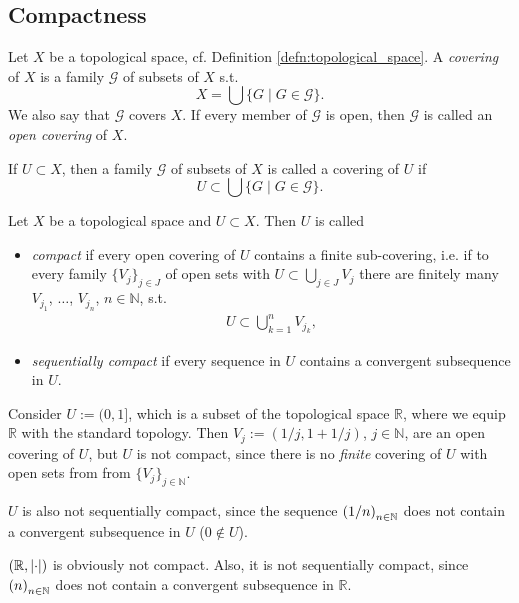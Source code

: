 \subsection{Compactness}

\begin{defn}
	Let $X$ be a topological space, cf. Definition \ref{defn:topological_space}. A \textit{covering} of $X$ is a family $\mathscr G$ of subsets of $X$ s.t. $$X = \bigcup\{G\mid G\in\mathscr G\}.$$
	We also say that $\mathscr G$ covers $X$. If every member of $\mathscr G$ is open, then $\mathscr G$ is called an \textit{open covering} of $X$.
	
	If $U\subset X$, then a family $\mathscr G$ of subsets of $X$ is called a covering of $U$ if
	$$U \subset \bigcup \{G\mid G\in \mathscr G\}.$$
\end{defn}

\begin{defn}
	Let $X$ be a topological space and $U\subset X$. Then $U$ is called 
	\begin{itemize}
		\item \textit{compact} if every open covering of $U$ contains a finite sub-covering, i.e. if to every family $\{V_j\}_{j\in J}$ of open sets with $U \subset \bigcup_{j\in J} V_j$ there are finitely many $V_{j_1}$, $\dots$, $V_{j_n}$, $n\in\mathbb N$, s.t. 
		\begin{align*}
			U \subset \bigcup_{k = 1}^{n}V_{j_k},
		\end{align*}
		\item \textit{sequentially compact} if every sequence in $U$ contains a convergent subsequence in $U$.
	\end{itemize}
\end{defn}

\begin{exmp}
	Consider $U := (0, 1]$, which is a subset of the topological space $\mathbb R$, where we equip $\mathbb R$ with the standard topology. Then $V_j := (1/j, 1 + 1/j)$, $j\in\mathbb N$, are an open covering of $U$, but $U$ is not compact, since there is no \textit{finite} covering of $U$ with open sets from from $\{V_j\}_{j\in\mathbb N}$.
	
	$U$ is also not sequentially compact, since the sequence $\seq[1/n]$ does not contain a convergent subsequence in $U$ ($0\notin U$).
\end{exmp}

\begin{exmp}
	$(\mathbb R, \abs{\cdot})$ is obviously not compact. Also, it is not sequentially compact, since $\seq[n]$ does not contain a convergent subsequence in $\mathbb R$.
\end{exmp}

